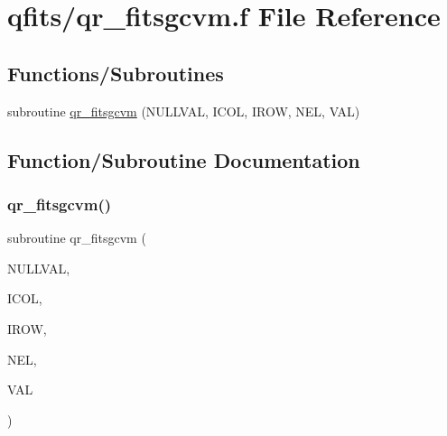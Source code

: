 \hypertarget{qr__fitsgcvm_8f}{}\section{qfits/qr\+\_\+fitsgcvm.f File Reference}
\label{qr__fitsgcvm_8f}
\subsection*{Functions/\+Subroutines}
\begin{DoxyCompactItemize}
\item 
subroutine \hyperlink{qr__fitsgcvm_8f_a7879bb67c98781dfd556ae6150a83144}{qr\+\_\+fitsgcvm} (N\+U\+L\+L\+V\+AL, I\+C\+OL, I\+R\+OW, N\+EL, V\+AL)
\end{DoxyCompactItemize}


\subsection{Function/\+Subroutine Documentation}
\mbox{\label{qr__fitsgcvm_8f_a7879bb67c98781dfd556ae6150a83144}} 
\subsubsection{\texorpdfstring{qr\+\_\+fitsgcvm()}{qr\_fitsgcvm()}}
{\footnotesize\ttfamily subroutine qr\+\_\+fitsgcvm (\begin{DoxyParamCaption}\item[{double precision}]{N\+U\+L\+L\+V\+AL,  }\item[{integer}]{I\+C\+OL,  }\item[{integer}]{I\+R\+OW,  }\item[{integer}]{N\+EL,  }\item[{double complex, dimension(nel)}]{V\+AL }\end{DoxyParamCaption})}

